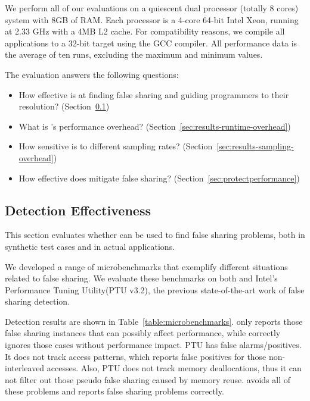 \label{sec:evaluation}

We perform all of our evaluations on a quiescent dual processor (totally 8 cores) system with 8GB of RAM. Each processor is a 4-core 64-bit Intel Xeon, running at 2.33 GHz with a 4MB L2 cache. For compatibility reasons, we compile all applications to a 32-bit target using the GCC compiler. All performance data is the average of ten runs, excluding the maximum and minimum values.

The evaluation answers the following questions:

\begin{itemize}
\item How effective is \sheriffdetect{} at finding false sharing and guiding programmers to their resolution? (Section~\ref{sec:effecteval})
\item What is \sheriffdetect{}'s performance overhead? (Section~\ref{sec:results-runtime-overhead})
\item How sensitive is \sheriffdetect{} to different sampling rates? (Section~\ref{sec:results-sampling-overhead}) 
\item How effective does \sheriffprotect{} mitigate false sharing? (Section~\ref{sec:protectperformance})
\end{itemize}

\subsection{Detection Effectiveness}

\label{sec:effecteval}

This section evaluates whether \sheriffdetect{} can be used to find false sharing problems, both in synthetic test cases and in actual applications.

We developed a range of microbenchmarks that exemplify different situations related to false sharing. We evaluate these benchmarks on both \SheriffDetect{} and Intel's Performance Tuning Utility(PTU v3.2), the previous state-of-the-art work of false sharing detection. 

Detection results are shown in Table~\ref{table:microbenchmarks}. \sheriffdetect{} only reports those false sharing instances that can possibly affect performance, while correctly ignores those cases without performance impact.
PTU has false alarms/positives.  It does not track access patterns, which reports false positives for those non-interleaved accesses. Also, PTU does not track memory deallocations, thus it can not filter out those pseudo false sharing caused by memory reuse. \sheriffdetect{} avoids all of these problems and reports false sharing problems correctly. 


